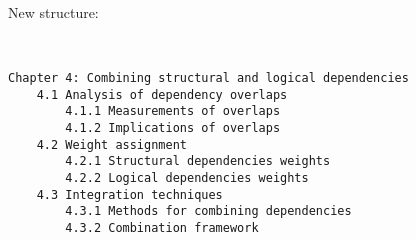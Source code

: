 New structure:
\begin{verbatim}


Chapter 4: Combining structural and logical dependencies
    4.1 Analysis of dependency overlaps
        4.1.1 Measurements of overlaps
        4.1.2 Implications of overlaps
    4.2 Weight assignment
        4.2.1 Structural dependencies weights
        4.2.2 Logical dependencies weights
    4.3 Integration techniques
        4.3.1 Methods for combining dependencies
        4.3.2 Combination framework
\end{verbatim}